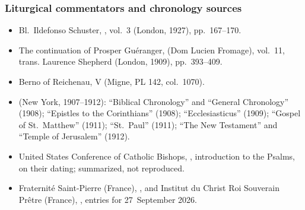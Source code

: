 {\subsubsection*{Liturgical commentators and chronology sources}
\begin{itemize}\setlength{\itemsep}{0.15em}\setlength{\parskip}{0pt}
\item Bl.\ Ildefonso Schuster, , vol.~3 (London, 1927), pp.~167--170.
\item The continuation of Prosper Guéranger,  (Dom Lucien Fromage), vol.~11, trans. Laurence Shepherd (London, 1909), pp.~393--409.
\item Berno of Reichenau,  V (Migne, PL 142, col.~1070).
\item {} (New York, 1907--1912): ``Biblical Chronology'' and ``General Chronology'' (1908); ``Epistles to the Corinthians'' (1908); ``Ecclesiasticus'' (1909); ``Gospel of St.\ Matthew'' (1911); ``St.\ Paul'' (1911); ``The New Testament'' and ``Temple of Jerusalem'' (1912).
\item United States Conference of Catholic Bishops, , introduction to the Psalms, on their dating; summarized, not reproduced.
\item Fraternité Saint-Pierre (France), , and Institut du Christ Roi Souverain Prêtre (France), , entries for 27~September 2026.
\end{itemize}
\par}

